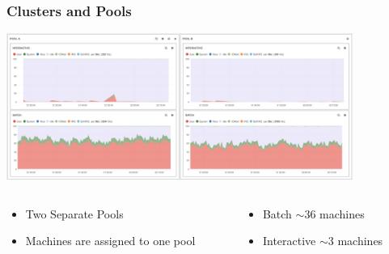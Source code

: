 \documentclass[aspectratio=169]{beamer}
\begin{document}
\begin{frame}

    \frametitle{Clusters and Pools}
    \begin{minipage}[t]{0.95\textwidth}
        \begin{center}
            \includegraphics[width=0.85\textwidth]{Puppet_Pools.png}
        \end{center}
    \end{minipage}
    \begin{minipage}[T]{0.95\textwidth}
        \begin{columns}
            \begin{column}{0.5\textwidth}
                \begin{itemize}
                    \item Two Separate Pools
                    \item Machines are assigned to one pool
                \end{itemize}
            \end{column}
            \begin{column}{0.5\textwidth}
                \begin{itemize}
                    \item Batch $\sim 36$ machines
                    \item Interactive $\sim 3$ machines
                \end{itemize}
            \end{column}
        \end{columns}
    \end{minipage}

\end{frame}

\end{document}
